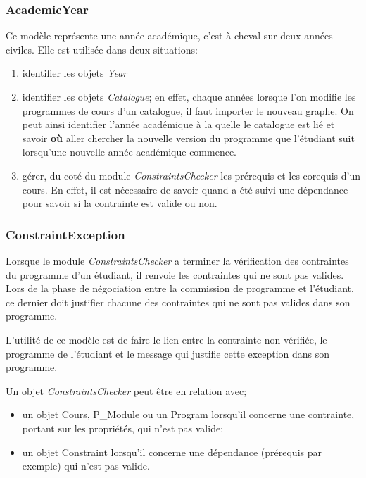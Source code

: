 \subsubsection{AcademicYear}
Ce modèle représente une année académique, c'est à cheval sur deux années civiles. Elle est utilisée dans deux situations:
\begin{enumerate}
  \item identifier les objets \textit{Year} 
  \item identifier les objets \textit{Catalogue}; en effet, chaque années lorsque l'on modifie les programmes de cours d'un catalogue, il faut importer le nouveau graphe. On peut ainsi identifier l'année académique à la quelle le catalogue est lié et savoir \textbf{où} aller chercher la nouvelle version du programme que l'étudiant suit lorsqu'une nouvelle année académique commence.
  \item gérer, du coté du module \textit{ConstraintsChecker} les prérequis et les corequis d'un cours. En effet, il est nécessaire de savoir quand a été suivi une dépendance pour savoir si la contrainte est valide ou non. 
\end{enumerate}

\subsubsection{ConstraintException}
Lorsque le module \textit{ConstraintsChecker} a terminer la vérification des contraintes du programme d'un étudiant, il renvoie les contraintes qui ne sont pas valides. Lors de la phase de négociation entre la commission de programme et l'étudiant, ce dernier doit justifier chacune des contraintes qui ne sont pas valides dans son programme.

L'utilité de ce modèle est de faire le lien entre la contrainte non vérifiée, le programme de l'étudiant et le message qui justifie cette exception dans son programme. 

Un objet \textit{ConstraintsChecker} peut être en relation avec;

\begin{itemize}
\item un objet Cours, P\_Module ou un Program lorsqu’il concerne une contrainte, portant sur les propriétés, qui n'est pas valide;
\item un objet Constraint lorsqu'il concerne une dépendance (prérequis par exemple) qui n'est pas valide.
\end{itemize}

